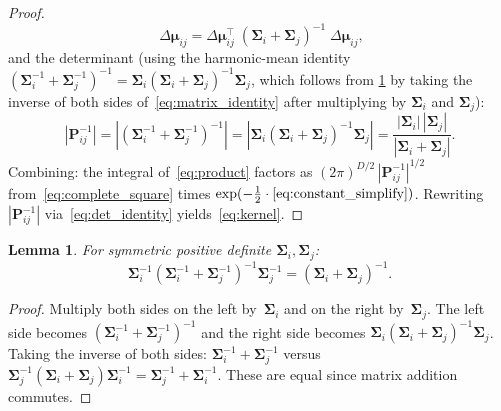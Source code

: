 \documentclass[11pt, a4paper]{article}
\theoremstyle{plain}
\newtheorem{lemma}[theorem]{Lemma}
\theoremstyle{definition}
\theoremstyle{remark}
\newcommand{\bmu}{\bm{\mu}}
\newcommand{\Sig}{\bm{\Sigma}}
\newcommand{\Prec}{\bm{P}}
\begin{document}
\begin{proof}
\begin{equation}
    \;\Delta\bmu_{ij}
  = \Delta\bmu_{ij}^\top\;
    (\Sig_i + \Sig_j)^{-1}
    \;\Delta\bmu_{ij},
\end{equation}
and the determinant (using the harmonic-mean identity
$(\Sig_i^{-1}{+}\Sig_j^{-1})^{-1} = \Sig_i(\Sig_i{+}\Sig_j)^{-1}\Sig_j$,
which follows from \cref{lem:identity} by taking the inverse of both
sides of~\eqref{eq:matrix_identity} after multiplying by
$\Sig_i$ and $\Sig_j$):
\begin{equation}\label{eq:det_identity}
  |\Prec_{ij}^{-1}|
  = |(\Sig_i^{-1} + \Sig_j^{-1})^{-1}|
  = |\Sig_i(\Sig_i + \Sig_j)^{-1}\Sig_j|
  = \frac{|\Sig_i|\,|\Sig_j|}{|\Sig_i + \Sig_j|}.
\end{equation}
Combining: the integral of~\eqref{eq:product} factors as
$(2\pi)^{D/2}\,|\Prec_{ij}^{-1}|^{1/2}$ from~\eqref{eq:complete_square}
times $\exp(-\frac{1}{2}\cdot\text{\eqref{eq:constant_simplify}})$.
Rewriting $|\Prec_{ij}^{-1}|$ via~\eqref{eq:det_identity}
yields~\eqref{eq:kernel}.
\end{proof}

\begin{lemma}\label{lem:identity}
For symmetric positive definite $\Sig_i, \Sig_j$:
\begin{equation}\label{eq:matrix_identity}
  \Sig_i^{-1}(\Sig_i^{-1} + \Sig_j^{-1})^{-1}\Sig_j^{-1}
  = (\Sig_i + \Sig_j)^{-1}.
\end{equation}
\end{lemma}
\begin{proof}
Multiply both sides on the left by~$\Sig_i$ and on the right
by~$\Sig_j$.  The left side becomes
$(\Sig_i^{-1} + \Sig_j^{-1})^{-1}$ and the right side becomes
$\Sig_i(\Sig_i + \Sig_j)^{-1}\Sig_j$.  Taking the inverse of both sides:
$\Sig_i^{-1} + \Sig_j^{-1}$
versus
$\Sig_j^{-1}(\Sig_i + \Sig_j)\Sig_i^{-1}
 = \Sig_j^{-1} + \Sig_i^{-1}$.
These are equal since matrix addition commutes.
\end{proof}
\end{document}
